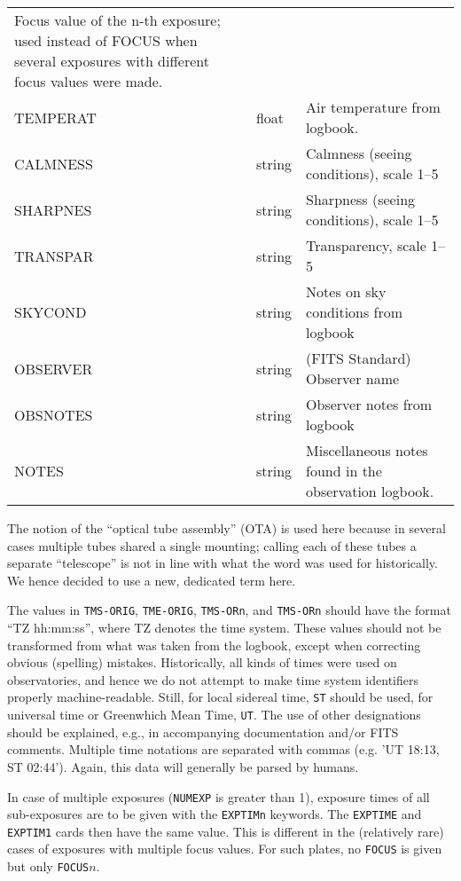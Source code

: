 \documentclass[11pt]{ivoa}
\newcommand\cardname[1]{\texttt{\color{keyword}#1}}
\begin{document}
\begin{longtable}{llp{}}
  Focus value of the n-th exposure; used instead of FOCUS when several
  exposures with different focus values were made.\\
TEMPERAT  &float   &Air temperature from logbook.\\
CALMNESS  &string  &
  Calmness (seeing conditions), scale 1–5\\
SHARPNES  &string  &Sharpness (seeing conditions), scale 1–5\\
TRANSPAR  &string  &
  Transparency, scale 1–5\\
SKYCOND   &string  &Notes on sky conditions from logbook\\
OBSERVER  &string  &(FITS Standard) Observer name\\
OBSNOTES  &string  &Observer notes from logbook\\
NOTES     &string  &Miscellaneous notes found in the observation
logbook.\\
\end{longtable}
\endgroup

The notion of the ``optical tube assembly'' (OTA) is used here because
in several cases multiple tubes shared a single mounting; calling each of
these tubes a separate ``telescope'' is not in line with what the word
was used for historically.  We hence decided to use a new, dedicated
term here.

The values in \cardname{TMS-ORIG}, \cardname{TME-ORIG},
\cardname{TMS-ORn}, and \cardname{TMS-ORn} should have the format
``TZ hh:mm:ss'', where TZ denotes the time system. These values should not be
transformed from what was taken from the logbook, except when
correcting obvious (spelling) mistakes.  Historically, all kinds of
times were used on observatories, and hence we do not attempt to make
time system identifiers properly machine-readable.  Still, for
local sidereal time, \verb|ST| should be used, for universal time or
Greenwhich Mean Time, \verb|UT|.  The use of other designations should
be explained, e.g., in accompanying documentation and/or FITS comments.
Multiple time notations are separated with commas (e.g. 'UT 18:13, ST
02:44').  Again, this data will generally be parsed by humans.

In case of multiple exposures (\cardname{NUMEXP} is greater than 1),
exposure times of all sub-exposures are to be given with the
\cardname{EXPTIMn} keywords.  The \cardname{EXPTIME} and
\cardname{EXPTIM1} cards then have the same value.  This is different in
the (relatively rare) cases of exposures with multiple focus values.
For such plates, no \cardname{FOCUS} is given but only
\cardname{FOCUS$n$}.
\end{document}
